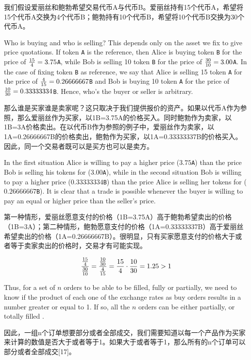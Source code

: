 \documentclass[UTF8,nofonts]{ctexart}
\begin{document}
\begin{multicols}{2}
我们假设爱丽丝和鲍勃希望交易代币A与代币B。爱丽丝持有15个代币A，希望将15个代币A交换为4个代币B；鲍勃持有10个代币B，希望将10个代币B交换为30个代币A。


Who is buying and who is selling? This depends only on the asset we fix to give price quotations. If token \verb|A| is the reference, then Alice is buying token \verb|B| for the price of ${15 \over 4} = 3.75$\verb|A|, while Bob is selling 10 token \verb|B| for the price of ${30 \over 10} = 3.00$\verb|A|. In the case of fixing token \verb|B| as reference, we say that Alice is selling 15 token \verb|A| for the price of ${4\over 15}=0.26666667$\verb|B| and Bob is buying 10 token \verb|A| for the price of ${10 \over 30}=0.33333334$\verb|B|. Hence, who's the buyer or seller is arbitrary.

那么谁是买家谁是卖家呢？这只取决于我们提供报价的资产。如果以代币A作为参照，那么爱丽丝作为买家，以1B=3.75A的价格买入。同时鲍勃作为卖家，以1B=3A价格卖出。在以代币B作为参照的例子中，爱丽丝作为卖家，以1A=0.26666667B的价格卖出，鲍勃作为买家，以1A=0.33333337B的价格买入。因此，同一个交易者既可以是买方也可以是卖方。


In the first situation Alice is willing to pay a higher price ($3.75$\verb|A|) than the price Bob is selling his tokens for ($3.00$\verb|A|), while in the second situation Bob is willing to pay a higher price ($0.33333334$\verb|B|) than the price Alice is selling her tokens for ($0.26666667$\verb|B|). It is clear that a trade is possible whenever the buyer is willing to pay an equal or higher price than the seller's price.

第一种情形，爱丽丝愿意支付的价格（1B=3.75A）高于鲍勃希望卖出的价格（1B=3A）；第二种情形，鲍勃愿意支付的价格（1A=0.33333337B）高于爱丽丝希望卖出的价格（1A=0.26666667B）。很明显，只有买家愿意支付的价格大于或者等于卖家卖出的价格时，交易才有可能实现。


\begin{equation}
{{15\over 4} \over {30\over 10}} = {{10\over 30} \over {4\over 15}}={15 \over 4} \cdot {10 \over 30} = 1.25 > 1
\end{equation}

Thus, for a set of $n$ orders to be able to be filled, fully or partially, we need to know if the product of each one of the exchange rates as buy orders results in a number greater or equal to 1. If so, all the $n$ orders can be either partially, or totally filled \cite{supersymmetry}.

因此，一组n个订单想要部分或者全部成交，我们需要知道以每一个产品作为买家来计算的数值是否大于或者等于1。如果大于或者等于1，那么所有的n个订单可以部分或者全部成交[17]。



\end{multicols}
\end{document}
